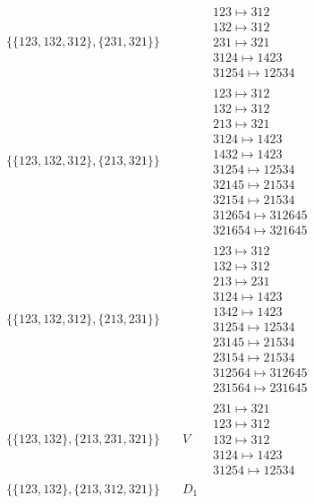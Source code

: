 \begin{tiny}
\begin{align}
\begin{matrix}
\end{matrix}
\\
\{\{123, 132, 312\}, \{231, 321\}\}
\quad
&
\phantom{.}
&
\begin{matrix}
123 \mapsto 312\\132 \mapsto 312\\231 \mapsto 321\\3124 \mapsto 1423\\31254 \mapsto 12534
\end{matrix}
\\
\{\{123, 132, 312\}, \{213, 321\}\}
\quad
&
\phantom{.}
&
\begin{matrix}
123 \mapsto 312\\132 \mapsto 312\\213 \mapsto 321\\3124 \mapsto 1423\\1432 \mapsto 1423\\31254 \mapsto 12534\\32145 \mapsto 21534\\32154 \mapsto 21534\\312654 \mapsto 312645\\321654 \mapsto 321645
\end{matrix}
\\
\{\{123, 132, 312\}, \{213, 231\}\}
\quad
&
\phantom{.}
&
\begin{matrix}
123 \mapsto 312\\132 \mapsto 312\\213 \mapsto 231\\3124 \mapsto 1423\\1342 \mapsto 1423\\31254 \mapsto 12534\\23145 \mapsto 21534\\23154 \mapsto 21534\\312564 \mapsto 312645\\231564 \mapsto 231645
\end{matrix}
\\
\{\{123, 132\}, \{213, 231, 321\}\}
\quad
&
V
&
\begin{matrix}
231 \mapsto 321\\123 \mapsto 312\\132 \mapsto 312\\3124 \mapsto 1423\\31254 \mapsto 12534
\end{matrix}
\\
\{\{123, 132\}, \{213, 312, 321\}\}
\quad
&
D_1
&
\begin{matrix}

\end{matrix}
\end{align}
\end{tiny}
